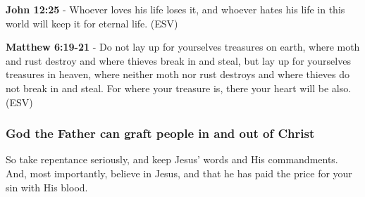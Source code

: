 \documentclass[11pt]{article}
\begin{document}
\textbf{John 12:25} - Whoever loves his life loses it, and whoever hates his life in this world will keep it for eternal life. (ESV)

\textbf{Matthew 6:19-21} - Do not lay up for yourselves treasures on earth, where moth and rust destroy and where thieves break in and steal, but lay up for yourselves treasures in heaven, where neither moth nor rust destroys and where thieves do not break in and steal. For where your treasure is, there your heart will be also. (ESV)

\subsubsection{God the Father can graft people in and out of Christ}
\label{sec:org8fad821}

So take repentance seriously, and keep Jesus' words and His commandments.
And, most importantly, believe in Jesus, and that he has paid the price for your sin with His blood.
\end{document}
